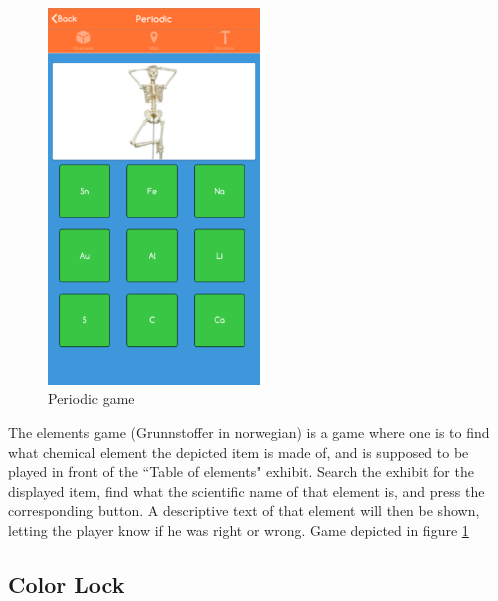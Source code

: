 \begin{figure}[H]
    \centering
    \includegraphics[width=0.5\textwidth]{images/app/Periodic.png}
    \caption{Periodic game}
    \label{fig:Periodic}
\end{figure}

The elements game (Grunnstoffer in norwegian) is a game where one is to find what chemical element the depicted item is made of, and is supposed to be played in front of the ``Table of elements" exhibit.
Search the exhibit for the displayed item, find what the scientific name of that element is, and press the corresponding button. A descriptive text of that element will then be shown, letting the player know if he was right or wrong. Game depicted in figure \ref{fig:Periodic}


\subsection{Color Lock}

